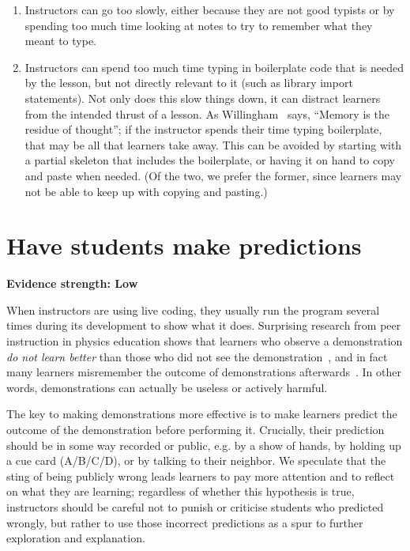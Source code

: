 \documentclass[10pt,letterpaper]{article}
\newcommand{\rulemajor}[2]{\section{#1}\label{#2}}
\newcommand{\evidence}[1]{\vspace{-0.3cm}\textbf{Evidence strength: #1}\vspace{0.5cm}}
\begin{document}
\begin{enumerate}

\item Instructors can go too slowly, either because they are not good
  typists or by spending too much time looking at notes to try to
  remember what they meant to type.

\item Instructors can spend too much time typing in boilerplate code
  that is needed by the lesson, but not directly relevant to it (such
  as library import statements). Not only does this slow things down, it can distract learners from the
  intended thrust of a lesson.  As Willingham~\cite{willingham-book} says,
  ``Memory is the residue of thought''; if the instructor spends their
  time typing boilerplate, that may be all that learners take away.
  This can be avoided by starting with a partial skeleton that
  includes the boilerplate, or having it on hand to copy and paste
  when needed.  (Of the two, we prefer the former, since learners
  may not be able to keep up with copying and pasting.)

\end{enumerate}

\rulemajor{Have students make predictions}{predictions}
\evidence{Low}

When instructors are using live coding, they usually run the program
several times during its development to show what it does.  Surprising research
from peer instruction in physics education shows that learners who
observe a demonstration \textit{do not learn better} than those who
did not see the demonstration~\cite{crouch-demo}, and in fact many
learners misremember the outcome of demonstrations
afterwards~\cite{miller-demo}.  In other words, demonstrations can
actually be useless or actively harmful.

The key to making demonstrations more effective is
to make learners predict the outcome of the demonstration before performing it.
Crucially, their prediction should be in some way recorded or public,
e.g. by a show of hands,
by holding up a cue card (A/B/C/D),
or by talking to their neighbor.
We speculate that the sting of being publicly wrong leads learners to pay more attention
and to reflect on what they are learning;
regardless of whether this hypothesis is true,
instructors should be careful not to punish or criticise students who predicted wrongly,
but rather to use those incorrect predictions as a spur to further exploration and explanation.
\end{document}
